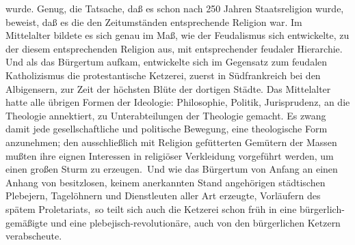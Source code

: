 wurde. Genug, die Tatsache, daß es schon nach 250 Jahren Staatsreligion
wurde, beweist, daß es die den Zeitumständen entsprechende Religion war.
Im Mittelalter bildete es sich genau im Maß, wie der Feudalismus sich
entwickelte, zu der diesem entsprechenden Religion aus, mit
entsprechender feudaler Hierarchie. Und als das Bürgertum aufkam,
entwickelte sich im Gegensatz zum feudalen Katholizismus die
protestantische Ketzerei, zuerst in Südfrankreich bei den Albigensern,
zur Zeit der höchsten Blüte der dortigen Städte. Das Mittelalter hatte
alle übrigen Formen der Ideologie: Philosophie, Politik, Jurisprudenz,
an die Theologie annektiert, zu Unterabteilungen der Theologie gemacht.
Es zwang damit jede gesellschaftliche und politische Bewegung, eine
theologische Form anzunehmen; den ausschließlich mit Religion
gefütterten Gemütern der Massen mußten ihre eignen Interessen in
religiöser Verkleidung vorgeführt werden, um einen großen Sturm zu
erzeugen. \textbar{}\,Und wie das Bürgertum von Anfang an einen Anhang von
besitzlosen, keinem anerkannten Stand angehörigen städtischen Plebejern,
Tagelöhnern und Dienstleuten aller Art erzeugte, Vorläufern des spätem
Proletariats,\,\textbar{} so teilt sich auch die Ketzerei schon früh in eine
bürgerlich-gemäßigte und eine plebejisch-revolutionäre, auch von den
bürgerlichen Ketzern verabscheute.


